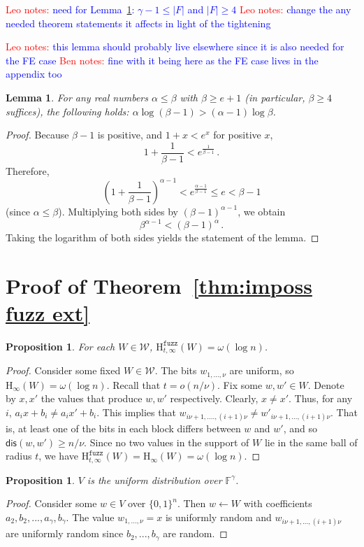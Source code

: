 \documentclass[11pt]{article}
\newcommand{\thref}[1]{\mbox{Theorem~\ref{#1}}}
\newcommand{\lemref}[1]{\mbox{Lemma~\ref{#1}}}
\newcommand{\zo}{\ensuremath{\{0, 1\}}}
\newcommand{\dis}{\ensuremath{\mathsf{dis}}}
\newcommand{\Hoo}{\mathrm{H}_\infty}
\newcommand{\Hfuzz}{\mathrm{H}^{\mathtt{fuzz}}_{t,\infty}}
\newtheorem{lemma}[theorem]{Lemma}
\newtheorem{proposition}[theorem]{Proposition}
\newcommand{\authnote}[2]{{\textcolor{red}{\textsf{#1 notes: }\textcolor{blue}{ #2}}\marginpar{\textcolor{red}{\textbf{!!!!!}}}}}
\newcommand{\authnote}[2]{}
\newcommand{\bnote}[1]{{\authnote{Ben}{#1}}}
\newcommand{\lnote}[1]{{\authnote{Leo}{#1}}}
\begin{document}
\lnote{need for \lemref{lem:log-minus-one}:  $\gamma-1\le |F|$ and $|F|\ge 4$}
\lnote{change the any needed theorem statements it affects in light of the tightening}

\lnote{this lemma should probably live elsewhere since it is also needed for the FE case}
\bnote{fine with it being here as the FE case lives in the appendix too}
\begin{lemma}
\label{lem:log-minus-one}
For any real numbers $\alpha \leq \beta$ with $\beta \ge e+1$ (in particular, $\beta\ge 4$ suffices), the following holds:
$\alpha \log (\beta-1) > (\alpha-1)\log \beta$. 
\end{lemma}

\begin{proof}
Because $\beta-1$ is positive, and $1+x<e^x$ for positive $x$,
$$1+\frac{1}{\beta-1} < e^{\frac{1}{\beta -1}}\,.$$  Therefore, 
$$\left(1+\frac{1}{\beta-1}\right)^{\alpha-1} < e^{\frac{\alpha-1}{\beta-1}}\le e < \beta-1$$ (since $\alpha\le \beta$). Multiplying both sides by $(\beta-1)^{\alpha-1}$, we obtain
$$\beta^{\alpha-1} < (\beta-1)^\alpha\,.$$
Taking the logarithm of both sides yields the statement of the lemma.
\end{proof}


\section{Proof of \thref{thm:imposs fuzz ext}}
\label{sec:fuzz ext proof}
\begin{proposition} 
\label{prop:dist fuzzy ent fuzz}
For each $W\in\mathcal{W}$, $\Hfuzz(W) = \omega(\log n)$.
\end{proposition}
\begin{proof}
Consider some fixed $W\in\mathcal{W}$.  The bits $w_{1,..., \nu}$ are uniform, so $\Hoo(W) =\omega(\log n)$.  Recall that $t=o (n/\nu)$. 
Fix some $w, w'\in W$.  Denote by $x, x'$ the values that produce $w, w'$ respectively.  Clearly, $x\neq x'$.  Thus, for any $i$, $a_i x + b_i \neq a_i x' + b_i$.  This implies that $w_{i\nu+1,...., (i+1)\nu} \neq w'_{i\nu+1,..., (i+1)\nu}$. That is, at least one of the bits in each block differs between $w$ and $w'$, and so $\dis(w, w') \ge n/\nu$. Since no two values in the support of $W$ lie in the same ball of radius $t$, we have $\Hfuzz(W) = \Hoo(W)= \omega(\log n)$.
\end{proof}

\begin{proposition}\label{prop:dist uniform fuzz}
$V$ is the uniform distribution over $\mathbb{F}^\gamma$.
\end{proposition}
\begin{proof}
Consider some $w\in V$ over $\zo^n$.  Then $w\leftarrow W$ with coefficients $a_2, b_2, ..., a_\gamma , b_\gamma$.  The value $w_{1,...,\nu} =x $ is uniformly random and $w_{i\nu+1,...,(i+1)\nu}$ are uniformly random since $b_2,..., b_\gamma$ are random.
\end{proof}
\end{document}
